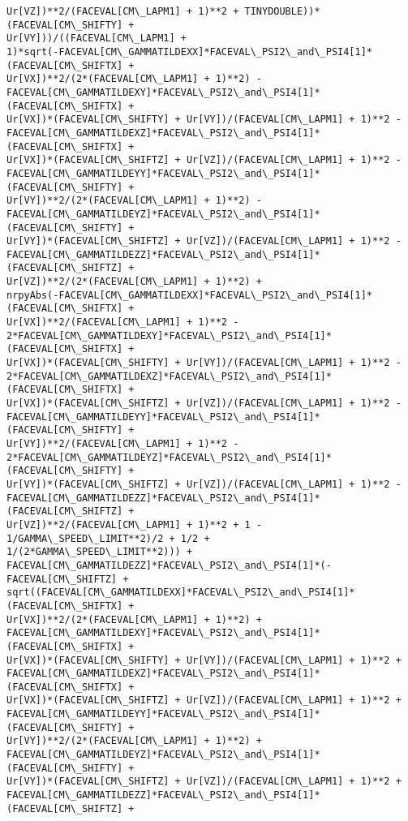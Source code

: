 \documentclass[landscape,letterpaper,10pt,english]{article}
\begin{document}
\begin{Verbatim}[commandchars=\\\{\}]
Ur[VZ])**2/(FACEVAL[CM\_LAPM1] + 1)**2 + TINYDOUBLE))*(FACEVAL[CM\_SHIFTY] +
Ur[VY]))/((FACEVAL[CM\_LAPM1] +
1)*sqrt(-FACEVAL[CM\_GAMMATILDEXX]*FACEVAL\_PSI2\_and\_PSI4[1]*(FACEVAL[CM\_SHIFTX] +
Ur[VX])**2/(2*(FACEVAL[CM\_LAPM1] + 1)**2) -
FACEVAL[CM\_GAMMATILDEXY]*FACEVAL\_PSI2\_and\_PSI4[1]*(FACEVAL[CM\_SHIFTX] +
Ur[VX])*(FACEVAL[CM\_SHIFTY] + Ur[VY])/(FACEVAL[CM\_LAPM1] + 1)**2 -
FACEVAL[CM\_GAMMATILDEXZ]*FACEVAL\_PSI2\_and\_PSI4[1]*(FACEVAL[CM\_SHIFTX] +
Ur[VX])*(FACEVAL[CM\_SHIFTZ] + Ur[VZ])/(FACEVAL[CM\_LAPM1] + 1)**2 -
FACEVAL[CM\_GAMMATILDEYY]*FACEVAL\_PSI2\_and\_PSI4[1]*(FACEVAL[CM\_SHIFTY] +
Ur[VY])**2/(2*(FACEVAL[CM\_LAPM1] + 1)**2) -
FACEVAL[CM\_GAMMATILDEYZ]*FACEVAL\_PSI2\_and\_PSI4[1]*(FACEVAL[CM\_SHIFTY] +
Ur[VY])*(FACEVAL[CM\_SHIFTZ] + Ur[VZ])/(FACEVAL[CM\_LAPM1] + 1)**2 -
FACEVAL[CM\_GAMMATILDEZZ]*FACEVAL\_PSI2\_and\_PSI4[1]*(FACEVAL[CM\_SHIFTZ] +
Ur[VZ])**2/(2*(FACEVAL[CM\_LAPM1] + 1)**2) +
nrpyAbs(-FACEVAL[CM\_GAMMATILDEXX]*FACEVAL\_PSI2\_and\_PSI4[1]*(FACEVAL[CM\_SHIFTX] +
Ur[VX])**2/(FACEVAL[CM\_LAPM1] + 1)**2 -
2*FACEVAL[CM\_GAMMATILDEXY]*FACEVAL\_PSI2\_and\_PSI4[1]*(FACEVAL[CM\_SHIFTX] +
Ur[VX])*(FACEVAL[CM\_SHIFTY] + Ur[VY])/(FACEVAL[CM\_LAPM1] + 1)**2 -
2*FACEVAL[CM\_GAMMATILDEXZ]*FACEVAL\_PSI2\_and\_PSI4[1]*(FACEVAL[CM\_SHIFTX] +
Ur[VX])*(FACEVAL[CM\_SHIFTZ] + Ur[VZ])/(FACEVAL[CM\_LAPM1] + 1)**2 -
FACEVAL[CM\_GAMMATILDEYY]*FACEVAL\_PSI2\_and\_PSI4[1]*(FACEVAL[CM\_SHIFTY] +
Ur[VY])**2/(FACEVAL[CM\_LAPM1] + 1)**2 -
2*FACEVAL[CM\_GAMMATILDEYZ]*FACEVAL\_PSI2\_and\_PSI4[1]*(FACEVAL[CM\_SHIFTY] +
Ur[VY])*(FACEVAL[CM\_SHIFTZ] + Ur[VZ])/(FACEVAL[CM\_LAPM1] + 1)**2 -
FACEVAL[CM\_GAMMATILDEZZ]*FACEVAL\_PSI2\_and\_PSI4[1]*(FACEVAL[CM\_SHIFTZ] +
Ur[VZ])**2/(FACEVAL[CM\_LAPM1] + 1)**2 + 1 - 1/GAMMA\_SPEED\_LIMIT**2)/2 + 1/2 +
1/(2*GAMMA\_SPEED\_LIMIT**2))) +
FACEVAL[CM\_GAMMATILDEZZ]*FACEVAL\_PSI2\_and\_PSI4[1]*(-FACEVAL[CM\_SHIFTZ] +
sqrt((FACEVAL[CM\_GAMMATILDEXX]*FACEVAL\_PSI2\_and\_PSI4[1]*(FACEVAL[CM\_SHIFTX] +
Ur[VX])**2/(2*(FACEVAL[CM\_LAPM1] + 1)**2) +
FACEVAL[CM\_GAMMATILDEXY]*FACEVAL\_PSI2\_and\_PSI4[1]*(FACEVAL[CM\_SHIFTX] +
Ur[VX])*(FACEVAL[CM\_SHIFTY] + Ur[VY])/(FACEVAL[CM\_LAPM1] + 1)**2 +
FACEVAL[CM\_GAMMATILDEXZ]*FACEVAL\_PSI2\_and\_PSI4[1]*(FACEVAL[CM\_SHIFTX] +
Ur[VX])*(FACEVAL[CM\_SHIFTZ] + Ur[VZ])/(FACEVAL[CM\_LAPM1] + 1)**2 +
FACEVAL[CM\_GAMMATILDEYY]*FACEVAL\_PSI2\_and\_PSI4[1]*(FACEVAL[CM\_SHIFTY] +
Ur[VY])**2/(2*(FACEVAL[CM\_LAPM1] + 1)**2) +
FACEVAL[CM\_GAMMATILDEYZ]*FACEVAL\_PSI2\_and\_PSI4[1]*(FACEVAL[CM\_SHIFTY] +
Ur[VY])*(FACEVAL[CM\_SHIFTZ] + Ur[VZ])/(FACEVAL[CM\_LAPM1] + 1)**2 +
FACEVAL[CM\_GAMMATILDEZZ]*FACEVAL\_PSI2\_and\_PSI4[1]*(FACEVAL[CM\_SHIFTZ] +

\end{Verbatim}
\end{document}
